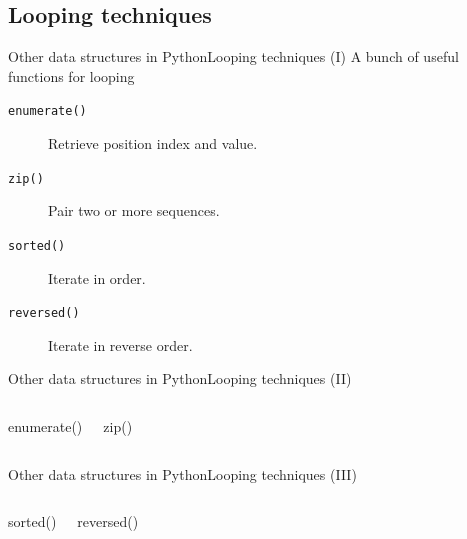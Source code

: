 \documentclass[10pt,compress]{beamer} %
\begin{document}
\subsection{Looping techniques}
\begin{frame}{Other data structures in Python}{Looping techniques (I)}
	A bunch of useful functions for looping
		\begin{description}
		\item[\texttt{enumerate()}] Retrieve position index and value.
		\item[\texttt{zip()}] Pair two or more sequences.
		\item[\texttt{sorted()}] Iterate in order.
		\item[\texttt{reversed()}] Iterate in reverse order.
		\end{description}
\end{frame}

\begin{frame}{Other data structures in Python}{Looping techniques (II)}
    \begin{columns}
 	   \column{\textwidth}
		\begin{block}{enumerate()}
		\vspace{-0.2cm}
		
		\vspace{-0.2cm}
		\end{block}

		\begin{block}{zip()}
		\vspace{-0.2cm}
		
		\vspace{-0.2cm}
		\end{block}

	\end{columns}
\end{frame}

\begin{frame}{Other data structures in Python}{Looping techniques (III)}
    \begin{columns}
 	   \column{\textwidth}
		\begin{block}{sorted()}
		\vspace{-0.2cm}
		
		\vspace{-0.2cm}
		\end{block}

		\begin{block}{reversed()}
		\vspace{-0.2cm}
		
		\vspace{-0.2cm}
		\end{block}

	\end{columns}
\end{frame}
\end{document}
